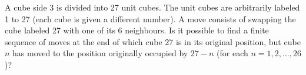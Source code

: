 A cube side 3 is divided into 27 unit cubes. The unit cubes are arbitrarily labeled 1 to 27 (each cube is given a different number). A move consists of swapping the cube labeled 27 with one of its 6 neighbours. Is it possible to find a finite sequence of moves at the end of which cube 27 is in its original position, but cube $n$ has moved to the position originally occupied by $27-n$ (for each $n = 1, 2, \ldots , 26$)?